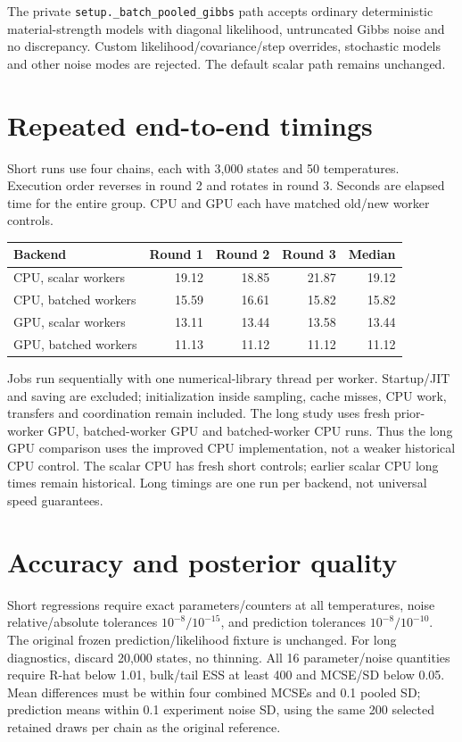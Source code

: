 \documentclass[11pt]{article}
\begin{document}
The private \texttt{setup.\_batch\_pooled\_gibbs} path accepts ordinary deterministic
material-strength models with diagonal likelihood, untruncated Gibbs noise and no
discrepancy. Custom likelihood/covariance/step overrides, stochastic models and
other noise modes are rejected. The default scalar path remains unchanged.
\section*{Repeated end-to-end timings}
Short runs use four chains, each with 3,000 states and 50 temperatures. Execution
order reverses in round 2 and rotates in round 3. Seconds are elapsed time for the
entire group. CPU and GPU each have matched old/new worker controls.
\begin{center}\begin{tabular}{lrrrr}\toprule
Backend & Round 1 & Round 2 & Round 3 & Median\\\midrule
CPU, scalar workers & 19.12 & 18.85 & 21.87 & 19.12\\
CPU, batched workers & 15.59 & 16.61 & 15.82 & 15.82\\
GPU, scalar workers & 13.11 & 13.44 & 13.58 & 13.44\\
GPU, batched workers & 11.13 & 11.12 & 11.12 & 11.12\\
\bottomrule\end{tabular}\end{center}
Jobs run sequentially with one numerical-library thread per worker. Startup/JIT
and saving are excluded; initialization inside sampling, cache misses, CPU work,
transfers and coordination remain included. The long study uses fresh prior-worker
GPU, batched-worker GPU and batched-worker CPU runs. Thus the long GPU comparison
uses the improved CPU implementation, not a weaker historical CPU control.
The scalar CPU has fresh short controls; earlier scalar CPU long times remain
historical. Long timings are one run per backend, not universal speed guarantees.
\section*{Accuracy and posterior quality}
Short regressions require exact parameters/counters at all temperatures, noise
relative/absolute tolerances $10^{-8}/10^{-15}$, and prediction tolerances
$10^{-8}/10^{-10}$. The original frozen prediction/likelihood fixture is unchanged.
For long diagnostics, discard 20,000 states, no thinning. All 16 parameter/noise
quantities require R-hat below 1.01, bulk/tail ESS at least 400 and MCSE/SD below
0.05. Mean differences must be within four combined MCSEs and 0.1 pooled SD;
prediction means within 0.1 experiment noise SD, using the same 200 selected
retained draws per chain as the original reference.
\end{document}
